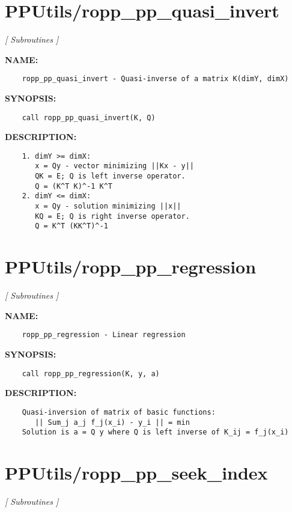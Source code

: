 \section{PPUtils/ropp\_pp\_quasi\_invert}
\textsl{[ Subroutines ]}

\label{ch:robo64}
\label{ch:PPUtils_ropp_pp_quasi_invert}
\textbf{NAME:}\hspace{0.08in}\begin{Verbatim}
    ropp_pp_quasi_invert - Quasi-inverse of a matrix K(dimY, dimX) 
\end{Verbatim}
\textbf{SYNOPSIS:}\hspace{0.08in}\begin{Verbatim}
    call ropp_pp_quasi_invert(K, Q)
\end{Verbatim}
\textbf{DESCRIPTION:}\hspace{0.08in}\begin{Verbatim}
    1. dimY >= dimX:
       x = Qy - vector minimizing ||Kx - y||
       QK = E; Q is left inverse operator.
       Q = (K^T K)^-1 K^T
    2. dimY <= dimX:
       x = Qy - solution minimizing ||x||
       KQ = E; Q is right inverse operator.
       Q = K^T (KK^T)^-1
\end{Verbatim}
\section{PPUtils/ropp\_pp\_regression}
\textsl{[ Subroutines ]}

\label{ch:robo65}
\label{ch:PPUtils_ropp_pp_regression}
\textbf{NAME:}\hspace{0.08in}\begin{Verbatim}
    ropp_pp_regression - Linear regression
\end{Verbatim}
\textbf{SYNOPSIS:}\hspace{0.08in}\begin{Verbatim}
    call ropp_pp_regression(K, y, a)
\end{Verbatim}
\textbf{DESCRIPTION:}\hspace{0.08in}\begin{Verbatim}
    Quasi-inversion of matrix of basic functions:
       || Sum_j a_j f_j(x_i) - y_i || = min
    Solution is a = Q y where Q is left inverse of K_ij = f_j(x_i) 
\end{Verbatim}
\section{PPUtils/ropp\_pp\_seek\_index}
\textsl{[ Subroutines ]}

